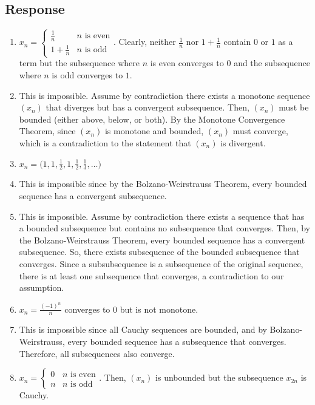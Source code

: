 \documentclass[13pt]{article}
\begin{document}
\subsection*{Response}
\begin{enumerate}[label=(\alph*)]
\item $x_n = 
  \begin{cases}
    \frac{1}{n} & n \text{ is even} \\
    1 + \frac{1}{n} & n \text{ is odd}
  \end{cases}$. Clearly, neither $\frac{1}{n}$ nor $1 + \frac{1}{n}$
  contain $0$ or $1$ as a term but the subsequence where $n$ is even
  converges to $0$ and the subsequence where $n$ is odd converges to $1$.
\item This is impossible. Assume by contradiction there exists a
  monotone sequence $(x_n)$ that diverges but has a convergent
  subsequence. Then, $(x_n)$ must be bounded (either above, below, or
  both). By the Monotone Convergence Theorem, since $(x_n)$ is
  monotone and bounded, $(x_n)$ must converge, which is a
  contradiction to the statement that $(x_n)$ is divergent.
\item $x_n = \big(1, 1, \frac{1}{2}, 1, \frac{1}{2}, \frac{1}{3},
  \ldots \big)$
\item This is impossible since by the Bolzano-Weirstrauss Theorem, every
  bounded sequence has a convergent subsequence.
\item This is impossible. Assume by contradiction there exists a
  sequence that has a bounded subsequence but contains no subsequence
  that converges. Then, by the Bolzano-Weirstrauss Theorem,
  every bounded sequence has a convergent subsequence. So, there exists
  subsequence of the bounded subsequence that converges. Since a
  subsubsequence is a subsequence of the original sequence, there is
  at least one subsequence that converges, a contradiction to our assumption.
\item $x_n = \frac{(-1)^n}{n}$ converges to 0 but is not monotone.
\item This is impossible since all Cauchy sequences are bounded, and
  by Bolzano-Weirstrauss, every bounded sequence has a subsequence
  that converges. Therefore, all subsequences also converge.
\item $x_n = 
  \begin{cases}
    0 & n \text{ is even} \\
    n & n \text{ is odd}
  \end{cases}$. Then, $(x_n)$ is unbounded but the subsequence
  $x_{2n}$ is Cauchy.
\end{enumerate}
\end{document}
